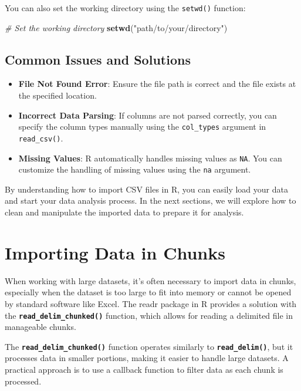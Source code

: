 \documentclass[
]{book}
\newenvironment{Shaded}{\begin{snugshade}}{\end{snugshade}}
\newcommand{\CommentTok}[1]{\textcolor[rgb]{0.56,0.35,0.01}{\textit{#1}}}
\newcommand{\FunctionTok}[1]{\textcolor[rgb]{0.13,0.29,0.53}{\textbf{#1}}}
\newcommand{\NormalTok}[1]{#1}
\newcommand{\StringTok}[1]{\textcolor[rgb]{0.31,0.60,0.02}{#1}}
\providecommand{\tightlist}{%
  \setlength{\itemsep}{0pt}\setlength{\parskip}{0pt}}
\begin{document}
You can also set the working directory using the \texttt{setwd()} function:

\begin{Shaded}
\begin{Highlighting}[]
\CommentTok{\# Set the working directory}
\FunctionTok{setwd}\NormalTok{(}\StringTok{"path/to/your/directory"}\NormalTok{)}
\end{Highlighting}
\end{Shaded}

\subsection{Common Issues and Solutions}\label{common-issues-and-solutions}

\begin{itemize}
\tightlist
\item
  \textbf{File Not Found Error}: Ensure the file path is correct and the file exists at the specified location.
\item
  \textbf{Incorrect Data Parsing}: If columns are not parsed correctly, you can specify the column types manually using the \texttt{col\_types} argument in \texttt{read\_csv()}.
\item
  \textbf{Missing Values}: R automatically handles missing values as \texttt{NA}. You can customize the handling of missing values using the \texttt{na} argument.
\end{itemize}

By understanding how to import CSV files in R, you can easily load your data and start your data analysis process. In the next sections, we will explore how to clean and manipulate the imported data to prepare it for analysis.

\newpage

\section{Importing Data in Chunks}\label{importing-data-in-chunks}

When working with large datasets, it's often necessary to import data in chunks, especially when the dataset is too large to fit into memory or cannot be opened by standard software like Excel. The readr package in R provides a solution with the \textbf{\texttt{read\_delim\_chunked()}} function, which allows for reading a delimited file in manageable chunks.

The \textbf{\texttt{read\_delim\_chunked()}} function operates similarly to \textbf{\texttt{read\_delim()}}, but it processes data in smaller portions, making it easier to handle large datasets. A practical approach is to use a callback function to filter data as each chunk is processed.
\end{document}
